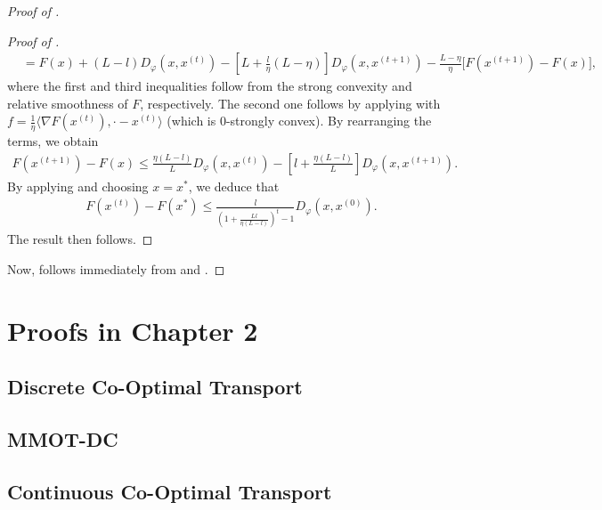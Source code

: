 \begin{proof}[Proof of ]
\begin{proof}[Proof of ]
\begin{align*}
    &= F(x) + (L - l) D_{\varphi}(x, x^{(t)})
    - \left[ L + \frac{l}{\eta}(L - \eta) \right] D_{\varphi}(x, x^{(t+1)})
    - \frac{L - \eta}{\eta} \big[ F(x^{(t+1)}) - F(x) \big],
\end{align*}
where the first and third inequalities follow from the strong convexity and
relative smoothness of $F$, respectively. The second one follows by applying
 with
$f = \frac{1}{\eta} \langle \nabla F(x^{(t)}), \cdot - x^{(t)} \rangle$
(which is $0$-strongly convex). By rearranging the terms, we obtain
\begin{align*}
    F(x^{(t+1)}) - F(x) \leq \frac{\eta(L-l)}{L} D_{\varphi}(x, x^{(t)})
    - \left[ l + \frac{\eta (L - l)}{L} \right] D_{\varphi}(x, x^{(t+1)}).
\end{align*}
By applying  and choosing $x = x^*$, we deduce that
\begin{align*}
    F(x^{(t)}) - F(x^*) \leq \frac{l}{\left( 1 + \frac{Ll }{\eta (L - l)} \right)^t - 1}
    D_{\varphi}(x, x^{(0)}).
\end{align*}
The result then follows.
\end{proof}
Now,  follows immediately from  and
.
\end{proof}

\section{Proofs in Chapter 2}

\subsection{Discrete Co-Optimal Transport}

\subsection{MMOT-DC}

\subsection{Continuous Co-Optimal Transport}

